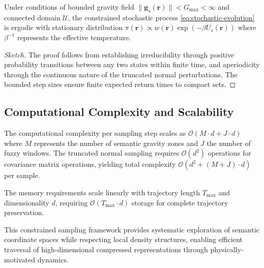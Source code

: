 \begin{theorem}
Under conditions of bounded gravity field $\|\mathbf{g}_s(\mathbf{r})\| < G_{\max} < \infty$ and connected domain $\mathcal{U}$, the constrained stochastic process \eqref{eq:stochastic-evolution} is ergodic with stationary distribution $\pi(\mathbf{r}) \propto w(\mathbf{r}) \exp(-\beta U_s(\mathbf{r}))$ where $\beta^{-1}$ represents the effective temperature.
\end{theorem}

\begin{proof}[Sketch]
The proof follows from establishing irreducibility through positive probability transitions between any two states within finite time, and aperiodicity through the continuous nature of the truncated normal perturbations. The bounded step sizes ensure finite expected return times to compact sets.
\end{proof}

\subsection{Computational Complexity and Scalability}

The computational complexity per sampling step scales as $\mathcal{O}(M \cdot d + J \cdot d)$ where $M$ represents the number of semantic gravity zones and $J$ the number of fuzzy windows. The truncated normal sampling requires $\mathcal{O}(d^2)$ operations for covariance matrix operations, yielding total complexity $\mathcal{O}(d^2 + (M + J) \cdot d)$ per sample.

The memory requirements scale linearly with trajectory length $T_{\max}$ and dimensionality $d$, requiring $\mathcal{O}(T_{\max} \cdot d)$ storage for complete trajectory preservation.

This constrained sampling framework provides systematic exploration of semantic coordinate spaces while respecting local density structures, enabling efficient traversal of high-dimensional compressed representations through physically-motivated dynamics.

